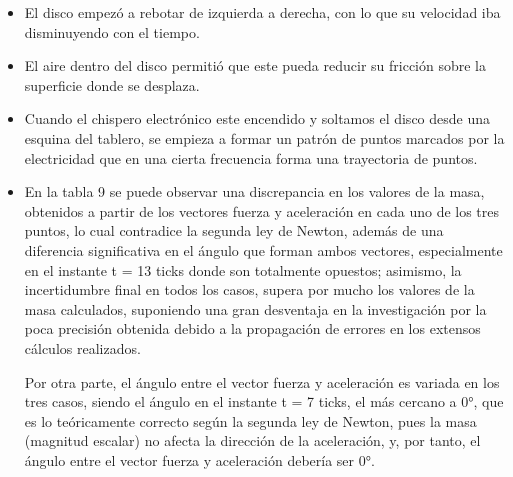 \documentclass[../main.tex]{subfiles}
\begin{document}
\begin{itemize}

    

    \item El disco empezó a rebotar de izquierda a derecha, con lo que su velocidad iba disminuyendo con el tiempo.
    \item El aire dentro del disco permitió que este pueda reducir su fricción sobre la superficie donde se desplaza.
    \item Cuando el chispero electrónico este encendido y soltamos el disco desde una esquina del tablero, se empieza a formar un patrón de puntos marcados por la electricidad que en una cierta frecuencia forma una trayectoria de puntos.
    
    \item En la tabla 9 se puede observar una discrepancia en los valores de la masa, obtenidos a partir de los vectores fuerza y aceleración en cada uno de los tres puntos, lo cual contradice la segunda ley de Newton, además de una diferencia significativa en el ángulo que forman ambos vectores, especialmente en el instante t = 13 ticks donde son totalmente opuestos; asimismo, la incertidumbre final en todos los casos, supera por mucho los valores de la masa calculados, suponiendo una gran desventaja en la investigación por la poca precisión obtenida debido a la propagación de errores en los extensos cálculos realizados. 
    
    Por otra parte, el ángulo entre el vector fuerza y aceleración es variada en los tres casos, siendo el ángulo en el instante t = 7 ticks, el más cercano a 0°, que es lo teóricamente correcto según la segunda ley de Newton, pues la masa (magnitud escalar) no afecta la dirección de la aceleración, y, por tanto, el ángulo entre el vector fuerza y aceleración debería ser 0°. 
    
\end{itemize}
\end{document}
